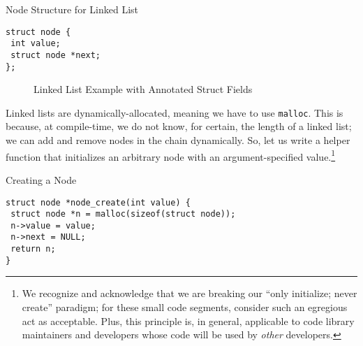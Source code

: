\begin{cl}[main.c]{Node Structure for Linked List}\begin{lstlisting}[language=MyC]
struct node {
 int value;
 struct node *next;
};
\end{lstlisting}\end{cl}


\begin{figure}[H]
\caption{Linked List Example with Annotated Struct Fields}
\label{fig:linkedlist}
\end{figure}

Linked lists are dynamically-allocated, meaning we have to use \texttt{malloc}. This is because, at compile-time, we do not know, for certain, the length of a linked list; we can add and remove nodes in the chain dynamically. So, let us write a helper function that initializes an arbitrary node with an argument-specified value.\footnote{We recognize and acknowledge that we are breaking our ``only initialize; never create'' paradigm; for these small code segments, consider such an egregious act as acceptable. Plus, this principle is, in general, applicable to code library maintainers and developers whose code will be used by \textit{other} developers.}

\begin{cl}[main.c]{Creating a Node}\begin{lstlisting}[language=MyC]
struct node *node_create(int value) {
 struct node *n = malloc(sizeof(struct node));
 n->value = value;
 n->next = NULL;
 return n;
}
\end{lstlisting}\end{cl}

